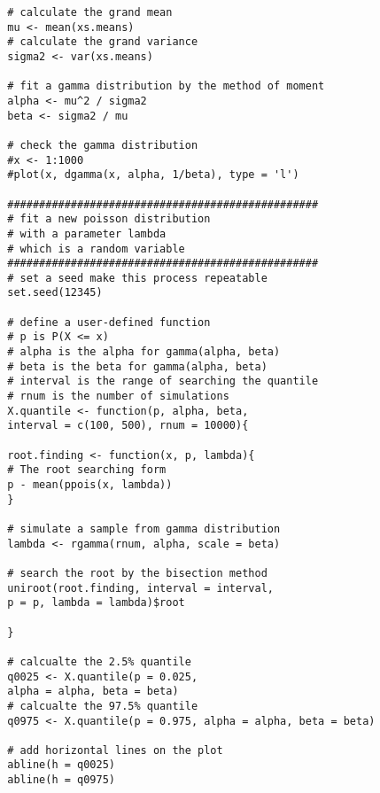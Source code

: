 \begin{enumerate}
\begin{verbatim}
		# calculate the grand mean
		mu <- mean(xs.means)
		# calculate the grand variance
		sigma2 <- var(xs.means)
		
		# fit a gamma distribution by the method of moment
		alpha <- mu^2 / sigma2
		beta <- sigma2 / mu
		
		# check the gamma distribution
		#x <- 1:1000 
		#plot(x, dgamma(x, alpha, 1/beta), type = 'l')
		
		#################################################
		# fit a new poisson distribution 
		# with a parameter lambda 
		# which is a random variable
		#################################################
		# set a seed make this process repeatable
		set.seed(12345)
		
		# define a user-defined function
		# p is P(X <= x)
		# alpha is the alpha for gamma(alpha, beta)
		# beta is the beta for gamma(alpha, beta)
		# interval is the range of searching the quantile
		# rnum is the number of simulations
		X.quantile <- function(p, alpha, beta, 
		interval = c(100, 500), rnum = 10000){
		
		root.finding <- function(x, p, lambda){
		# The root searching form
		p - mean(ppois(x, lambda))
		}
		
		# simulate a sample from gamma distribution
		lambda <- rgamma(rnum, alpha, scale = beta)
		
		# search the root by the bisection method
		uniroot(root.finding, interval = interval, 
		p = p, lambda = lambda)$root
		
		}
		
		# calcualte the 2.5% quantile
		q0025 <- X.quantile(p = 0.025, 
		alpha = alpha, beta = beta)
		# calcualte the 97.5% quantile
		q0975 <- X.quantile(p = 0.975, alpha = alpha, beta = beta)
		
		# add horizontal lines on the plot
		abline(h = q0025)
		abline(h = q0975)
	\end{verbatim}
\end{enumerate}